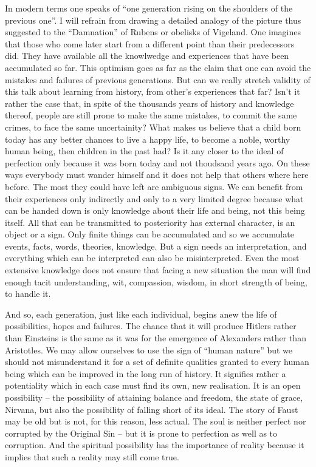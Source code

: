 In modern terms one speaks of ``one generation rising on the shoulders of
the previous one''. I will refrain from drawing a detailed analogy of the 
picture thus suggested to the 
``Damnation'' of Rubens or obelisks of Vigeland. One imagines that those who
come later start from a different point than their predecessors did. They have
available all the knowlwedge and experiences that have been accumulated so 
far. This optimism goes as far as the claim that one can avoid the mistakes and
failures of previous generations. But can we really stretch validity of this 
talk about learning from history, from other's experiences that far? Isn't it
rather the case that, in spite of the thousands  years of history and
knowledge thereof, people are still prone to make the same mistakes, to 
commit the same crimes, to face the same uncertainity? What makes us believe
that a child born today has any better chances to live a happy life, to
become a noble, worthy human being, then children in the past had? Is it any
closer to the ideal of perfection only because it was born today and not 
thoudsand years ago. On these ways everybody must wander himself and it does 
not help that others where here before. The most they could have left are
ambiguous signs. We can benefit from their experiences only indirectly and
only to a very limited degree because what can be handed down is only 
knowledge about their life and being, not this being itself. All that can be
transmitted to posteriority has external character, is an object or a sign.
Only finite things can be accumulated and so we accumulate events, facts,
words, theories, knowledge. But a sign needs an interpretation,
and everything which can be interpreted can also be misinterpreted. Even the
most extensive knowledge does not ensure that facing a new situation the man 
will find enough tacit understanding, wit, compassion, wisdom, in short 
strength of being, to handle it.

And so, each generation, just like each individual, begins anew the life of 
possibilities, hopes and failures. The chance that it will produce Hitlers
rather than Einsteins is the same as it was for the emergence of Alexanders
rather than Aristotles.  We may allow ourselves to use the sign of ``human nature''
but we should not misunderstand it for a set of definite qualities granted to
every human being which can be improved in the long run of history. It
signifies rather a potentiality which in each case must find its own, new
realisation. It is an open possibility -- the possibility of attaining balance
and freedom, the state of grace, Nirvana, but also the possibility of
falling short of its ideal. The story of Faust may be old but is not, for this
reason, less actual. The soul is neither perfect nor corrupted by the Original Sin 
-- but it is prone to perfection as well as to corruption.
And the spiritual  possibility has
the importance of reality because it implies that such a reality may still
come true.

